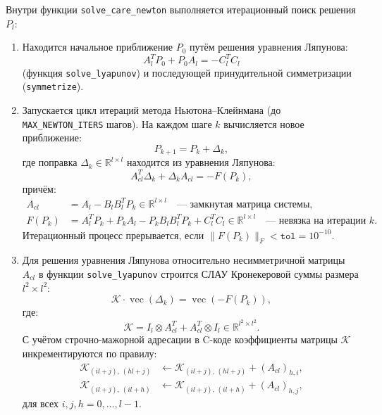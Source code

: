 \documentclass[12pt, a4paper, oneside]{extarticle}
\begin{document}
Внутри функции \texttt{solve\_care\_newton} выполняется итерационный поиск
решения $P_l$:
\begin{enumerate}
    \item Находится начальное приближение $P_0$ путём решения уравнения
    Ляпунова:
    \begin{equation*}
        A_l^T P_0 + P_0 A_l = -C_l^T C_l
    \end{equation*}
    (функция \texttt{solve\_lyapunov}) и последующей принудительной
    симметризации (\texttt{symmetrize}).

    \item Запускается цикл итераций метода Ньютона--Клейнмана (до
    \texttt{MAX\_NEWTON\_ITERS} шагов). На каждом шаге $k$ вычисляется новое
    приближение:
    \begin{equation*}
        P_{k+1} = P_k + \Delta_k,
    \end{equation*}
    где поправка $\Delta_k \in \mathbb{R}^{l \times l}$ находится из уравнения
    Ляпунова:
    \begin{equation*}
        A_{cl}^T \Delta_k + \Delta_k A_{cl} = -F(P_k),
    \end{equation*}
    причём:
    \begin{align*}
        A_{cl}  &= A_l - B_l B_l^T P_k \in \mathbb{R}^{l \times l}
                   \quad\text{--- замкнутая матрица системы,}\\
        F(P_k)  &= A_l^T P_k + P_k A_l - P_k B_l B_l^T P_k + C_l^T C_l
                   \in \mathbb{R}^{l \times l}
                   \quad\text{--- невязка на итерации }k.
    \end{align*}
    Итерационный процесс прерывается, если $\|F(P_k)\|_F < \texttt{tol} =
    10^{-10}$.

    \item Для решения уравнения Ляпунова относительно несимметричной матрицы
    $A_{cl}$ в функции \texttt{solve\_lyapunov} строится СЛАУ Кронекеровой
    суммы размера $l^2 \times l^2$:
    \begin{equation*}
        \mathcal{K} \cdot \operatorname{vec}(\Delta_k)
        = \operatorname{vec}(-F(P_k)),
    \end{equation*}
    где:
    \begin{equation*}
        \mathcal{K} = I_l \otimes A_{cl}^T + A_{cl}^T \otimes I_l
        \in \mathbb{R}^{l^2 \times l^2}.
    \end{equation*}
    С учётом строчно-мажорной адресации в C-коде коэффициенты матрицы
    $\mathcal{K}$ инкрементируются по правилу:
    \begin{align*}
        \mathcal{K}_{(il+j),\,(hl+j)} &\leftarrow
        \mathcal{K}_{(il+j),\,(hl+j)} + (A_{cl})_{h,i}, \\
        \mathcal{K}_{(il+j),\,(il+h)} &\leftarrow
        \mathcal{K}_{(il+j),\,(il+h)} + (A_{cl})_{h,j},
    \end{align*}
    для всех $i,j,h = 0,\dots,l-1$.


\end{enumerate}
\end{document}
